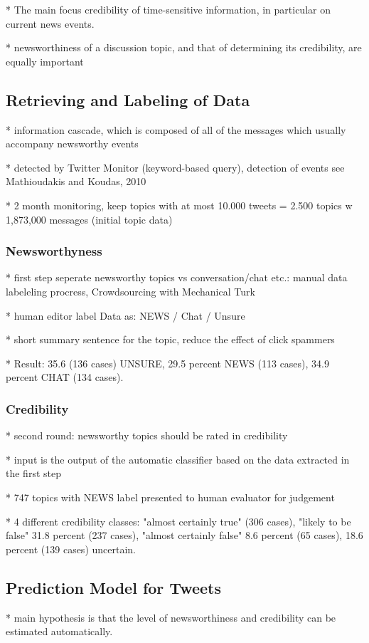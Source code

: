 \documentclass{proseminar}
\begin{document}
* The main focus credibility of time-sensitive information, in particular on current news events. 

* newsworthiness of a discussion topic, and that of determining its credibility, are equally important


\subsection{Retrieving and Labeling of Data}
* information cascade, which is composed of all of the messages which usually accompany newsworthy events

* detected by Twitter Monitor (keyword-based query), detection of events see Mathioudakis and Koudas, 2010

* 2 month monitoring, keep topics with at most 10.000 tweets = 2.500 topics w  1,873,000 messages (initial topic data)


\subsubsection*{Newsworthyness}
* first step seperate newsworthy topics vs conversation/chat etc.: manual data labeleling procress, Crowdsourcing with Mechanical Turk

* human editor label Data as: NEWS / Chat / Unsure

* short summary sentence for the topic, reduce the effect of click spammers

* Result:  35.6 (136 cases) UNSURE, 29.5 percent NEWS (113 cases), 34.9 percent CHAT (134 cases).

\subsubsection*{Credibility}
* second round: newsworthy topics should be rated in credibility

* input is the output of the automatic classifier based on the data extracted in the first step

* 747 topics with NEWS label presented to human evaluator for judgement

* 4 different credibility classes: "almost certainly true" (306 cases), "likely to be false" 31.8 percent (237 cases), "almost certainly false" 8.6
percent (65 cases), 18.6 percent (139 cases) uncertain.

\subsection{Prediction Model for Tweets}
* main hypothesis is that the level of newsworthiness and credibility can be estimated automatically.
\end{document}
